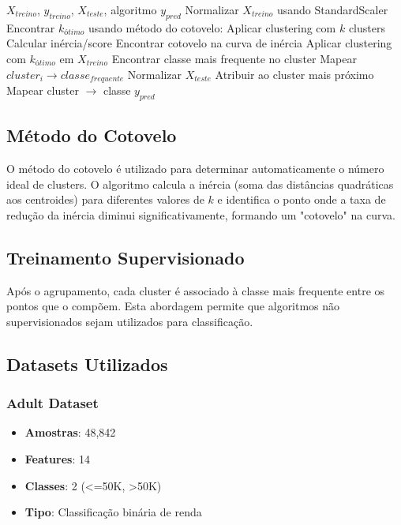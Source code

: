 \documentclass[12pt,a4paper]{article}
\begin{document}
\begin{algorithm}[H]
\caption{Classificador Baseado em Clustering}
\begin{algorithmic}[1]
\REQUIRE $X_{treino}$, $y_{treino}$, $X_{teste}$, algoritmo
\ENSURE $y_{pred}$
\STATE Normalizar $X_{treino}$ usando StandardScaler
\STATE Encontrar $k_{ótimo}$ usando método do cotovelo:
    \STATE Aplicar clustering com $k$ clusters
    \STATE Calcular inércia/score
\ENDFOR
\STATE Encontrar cotovelo na curva de inércia
\STATE Aplicar clustering com $k_{ótimo}$ em $X_{treino}$
    \STATE Encontrar classe mais frequente no cluster
    \STATE Mapear $cluster_i \rightarrow classe_{frequente}$
\ENDFOR
\STATE Normalizar $X_{teste}$
    \STATE Atribuir ao cluster mais próximo
    \STATE Mapear cluster $\rightarrow$ classe
\ENDFOR
\RETURN $y_{pred}$
\end{algorithmic}
\end{algorithm}

\subsection{Método do Cotovelo}

O método do cotovelo é utilizado para determinar automaticamente o número ideal de clusters. O algoritmo calcula a inércia (soma das distâncias quadráticas aos centroides) para diferentes valores de $k$ e identifica o ponto onde a taxa de redução da inércia diminui significativamente, formando um "cotovelo" na curva.

\subsection{Treinamento Supervisionado}

Após o agrupamento, cada cluster é associado à classe mais frequente entre os pontos que o compõem. Esta abordagem permite que algoritmos não supervisionados sejam utilizados para classificação.

\subsection{Datasets Utilizados}

\subsubsection{Adult Dataset}
\begin{itemize}
    \item \textbf{Amostras}: 48,842
    \item \textbf{Features}: 14
    \item \textbf{Classes}: 2 (<=50K, >50K)
    \item \textbf{Tipo}: Classificação binária de renda
\end{itemize}
\end{document}
